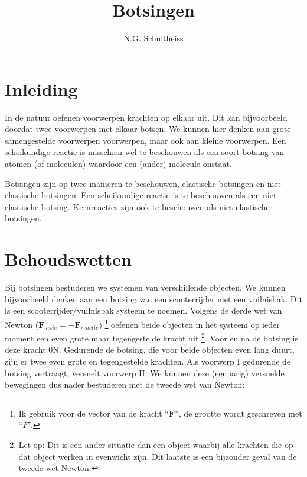 



\title{Botsingen}
\author{N.G. Schultheiss}
\date{}

\maketitle
\thispagestyle{firststyle}

\section{Inleiding}

In de natuur oefenen voorwerpen krachten op elkaar uit. Dit kan bijvoorbeeld
doordat twee voorwerpen met elkaar botsen. We kunnen hier denken aan
grote samengestelde voorwerpen voorwerpen, maar ook aan kleine voorwerpen.
Een scheikundige reactie is misschien wel te beschouwen als een soort
botsing van atomen (of moleculen) waardoor een (ander) molecule onstaat.

Botsingen zijn op twee manieren te beschouwen, elastische botsingen
en niet-elastische botsingen. Een scheikundige reactie is te beschouwen
als een niet-elastische botsing. Kernreacties zijn ook te beschouwen
als niet-elastische botsingen.


\section{Behoudswetten}

Bij botsingen bestuderen we systemen van verschillende objecten. We
kunnen bij\-voorbeeld denken aan een botsing van een scooterrijder
met een vuilnisbak. Dit is een scooterrijder/vuilnisbak systeem te
noemen. Volgens de derde wet van Newton ($\mathbf{F}_{actie}=-\mathbf{F}_{reactie}$)
\footnote{Ik gebruik voor de vector van de kracht ``$\mathbf{F}$'', de grootte
wordt geschreven met ``$F$''.
} oefenen beide objecten in het systeem op ieder moment een even grote
maar tegengestelde kracht uit
\footnote{Let op: Dit is een ander situatie dan een object waarbij alle
krachten die op dat object werken in evenwicht zijn. Dit laatste is een
bijzonder geval van de tweede wet Newton.}. Voor en na de botsing is deze kracht 0N. Gedurende de botsing, die
voor beide objecten even lang duurt, zijn er twee even grote en tegengestelde
krachten. Als voorwerp I gedurende de botsing vertraagt, versnelt
voorwerp II. We kunnen deze (eenparig) versnelde bewegingen dus nader
bestuderen met de tweede wet van Newton:

